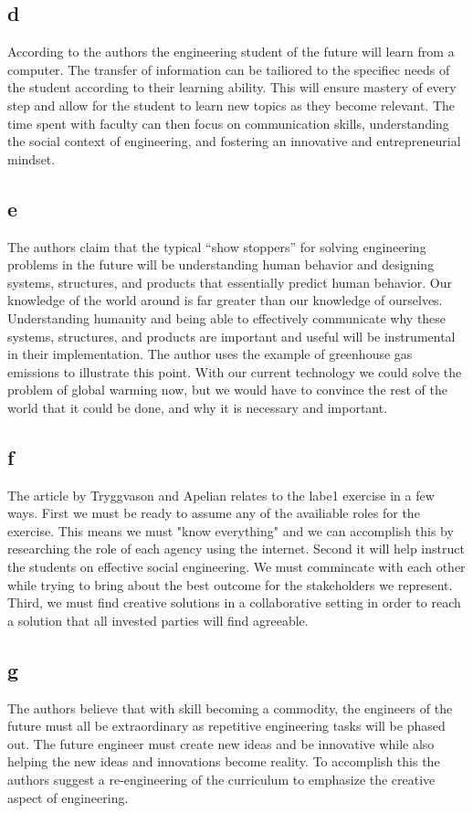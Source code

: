 \documentclass[12pt]{article} %
\begin{document}
	\subsection{d}
		According to the authors the engineering student of the future will learn from a computer. The transfer of information can be tailiored to the specifiec needs of the student according to their learning ability. This will ensure mastery of every step and allow for the student to learn new topics as they become relevant. The time spent with faculty can then focus on communication skills, understanding the social context of engineering, and fostering an innovative and entrepreneurial mindset.

	\subsection{e}
		The authors claim that the typical “show stoppers” for solving engineering problems in the future will be understanding human behavior and designing systems, structures, and products that essentially predict human behavior. Our knowledge of the world around is far greater than our knowledge of ourselves. Understanding humanity and being able to effectively communicate why these systems, structures, and products are important and useful will be instrumental in their implementation. The author uses the example of greenhouse gas emissions to illustrate this point. With our current technology we could solve the problem of global warming now, but we would have to convince the rest of the world that it could be done, and why it is necessary and important.

	\subsection{f}
		The article by Tryggvason and Apelian relates to the labe1 exercise in a few ways. First we must be ready to assume any of the availiable roles for the exercise. This means we must "know everything" and we can accomplish this by researching the role of each agency using the internet. Second it will help instruct the students on effective social engineering. We must commincate with each other while trying to bring about the best outcome for the stakeholders we represent. Third, we must find creative solutions in a collaborative setting in order to reach a solution that all invested parties will find agreeable.

	\subsection{g}
		The authors believe that with skill becoming a commodity, the engineers of the future must all be extraordinary as repetitive engineering tasks will be phased out. The future engineer must create new ideas and be innovative while also helping the new ideas and innovations become reality. To accomplish this the authors suggest a re-engineering of the curriculum to emphasize the creative aspect of engineering.
\end{document}
